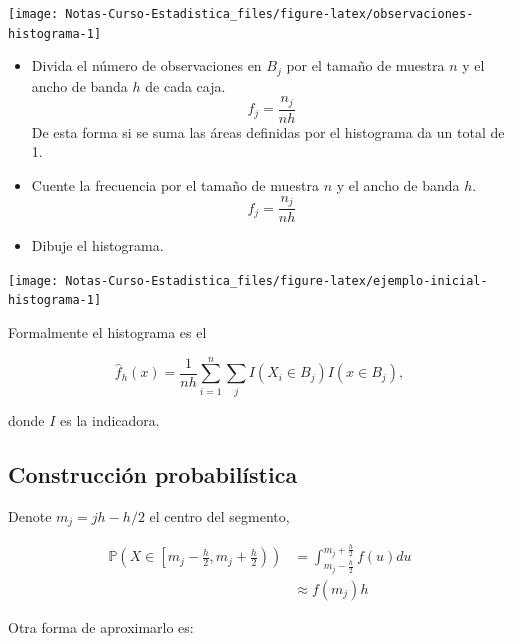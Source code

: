 \documentclass[
  12pt,
]{book}
\theoremstyle{definition}
\theoremstyle{definition}
\theoremstyle{definition}
\theoremstyle{definition}
\theoremstyle{remark}
\begin{document}
\begin{center}\texttt{[image: Notas-Curso-Estadistica\_files/figure-latex/observaciones-histograma-1]} \end{center}

\begin{itemize}
\item
  Divida el número de observaciones en \(B_j\) por el tamaño de muestra \(n\) y el ancho de banda \(h\) de cada caja.
  \begin{equation*}
  f_j = \frac{n_j}{nh}
  \end{equation*}
  De esta forma si se suma las áreas definidas por el histograma da un total de 1.
\item
  Cuente la frecuencia por el tamaño de muestra \(n\) y el ancho de banda \(h\).
  \begin{equation*}
    f_j = \frac{n_j}{nh}
    \end{equation*}
\item
  Dibuje el histograma.
\end{itemize}

\begin{center}\texttt{[image: Notas-Curso-Estadistica\_files/figure-latex/ejemplo-inicial-histograma-1]} \end{center}

Formalmente el histograma es el

\begin{equation*}
\hat{f}_h(x) = \frac{1}{nh} \sum_{i = 1}^{n} \sum_{j} I(X_i\in B_j) I(x\in B_j),
\end{equation*}

donde \(I\) es la indicadora.

\hypertarget{construcciuxf3n-probabiluxedstica}{%
\subsection{Construcción probabilística}\label{construcciuxf3n-probabiluxedstica}}

Denote \(m_j=jh-h/2\) el centro del segmento,

\begin{align*}
    \mathbb{P}\left(X\in \left[m_j - \frac{h}{2},m_j + \frac{h}{2} \right)\right)
      & =
    \int_{m_j - \frac{h}{2}}^{m_j + \frac{h}{2}} f(u)du                                             \\
      & \approx f(m_j)h
\end{align*}

Otra forma de aproximarlo es:
\end{document}
